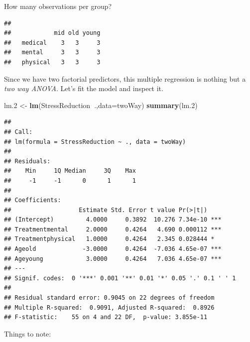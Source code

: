 \documentclass[]{book}
\newenvironment{Shaded}{\begin{snugshade}}{\end{snugshade}}
\newcommand{\DataTypeTok}[1]{\textcolor[rgb]{0.13,0.29,0.53}{#1}}
\newcommand{\FloatTok}[1]{\textcolor[rgb]{0.00,0.00,0.81}{#1}}
\newcommand{\KeywordTok}[1]{\textcolor[rgb]{0.13,0.29,0.53}{\textbf{#1}}}
\newcommand{\NormalTok}[1]{#1}
\newcommand{\OperatorTok}[1]{\textcolor[rgb]{0.81,0.36,0.00}{\textbf{#1}}}
\newcommand{\StringTok}[1]{\textcolor[rgb]{0.31,0.60,0.02}{#1}}
\theoremstyle{definition}
\theoremstyle{definition}
\theoremstyle{definition}
\theoremstyle{remark}
\begin{document}
How many observations per group?

\begin{Shaded}
\end{Shaded}

\begin{verbatim}
##           
##            mid old young
##   medical    3   3     3
##   mental     3   3     3
##   physical   3   3     3
\end{verbatim}

Since we have two factorial predictors, this multiple regression is nothing but a \emph{two way ANOVA}.
Let's fit the model and inspect it.

\begin{Shaded}
\begin{Highlighting}[]
\NormalTok{lm}\FloatTok{.2}\NormalTok{ <-}\StringTok{ }\KeywordTok{lm}\NormalTok{(StressReduction}\OperatorTok{~}\NormalTok{.,}\DataTypeTok{data=}\NormalTok{twoWay)}
\KeywordTok{summary}\NormalTok{(lm}\FloatTok{.2}\NormalTok{)}
\end{Highlighting}
\end{Shaded}

\begin{verbatim}
## 
## Call:
## lm(formula = StressReduction ~ ., data = twoWay)
## 
## Residuals:
##    Min     1Q Median     3Q    Max 
##     -1     -1      0      1      1 
## 
## Coefficients:
##                   Estimate Std. Error t value Pr(>|t|)    
## (Intercept)         4.0000     0.3892  10.276 7.34e-10 ***
## Treatmentmental     2.0000     0.4264   4.690 0.000112 ***
## Treatmentphysical   1.0000     0.4264   2.345 0.028444 *  
## Ageold             -3.0000     0.4264  -7.036 4.65e-07 ***
## Ageyoung            3.0000     0.4264   7.036 4.65e-07 ***
## ---
## Signif. codes:  0 '***' 0.001 '**' 0.01 '*' 0.05 '.' 0.1 ' ' 1
## 
## Residual standard error: 0.9045 on 22 degrees of freedom
## Multiple R-squared:  0.9091, Adjusted R-squared:  0.8926 
## F-statistic:    55 on 4 and 22 DF,  p-value: 3.855e-11
\end{verbatim}

Things to note:
\end{document}
